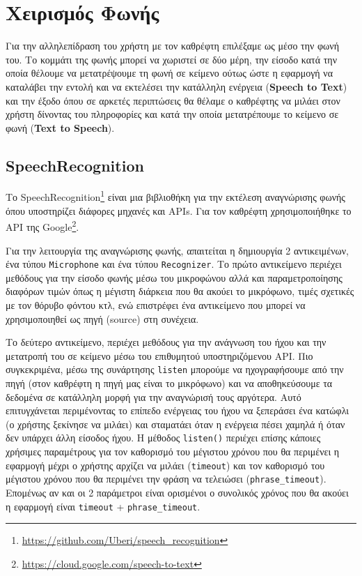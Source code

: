 \section{Χειρισμός Φωνής}
\label{sec:voice}

Για την αλληλεπίδραση του χρήστη με τον καθρέφτη επιλέξαμε ως μέσο την φωνή του. Το κομμάτι της φωνής μπορεί να χωριστεί σε δύο μέρη, την είσοδο κατά την οποία θέλουμε να μετατρέψουμε τη φωνή σε κείμενο ούτως ώστε η εφαρμογή να καταλάβει την εντολή και να εκτελέσει την κατάλληλη ενέργεια (\textbf{Speech to Text}) και την έξοδο όπου σε αρκετές περιπτώσεις θα θέλαμε ο καθρέφτης να μιλάει στον χρήστη δίνοντας του πληροφορίες και κατά την οποία μετατρέπουμε το κείμενο σε φωνή (\textbf{Text to Speech}).

\subsection{SpeechRecognition}
Το SpeechRecognition\footnote{\href{https://github.com/Uberi/speech\_recognition}{https://github.com/Uberi/speech\_recognition}} είναι μια βιβλιοθήκη για την εκτέλεση αναγνώρισης φωνής όπου υποστηρίζει διάφορες μηχανές και APIs. Για τον καθρέφτη χρησιμοποιήθηκε το API της Google\footnote{\href{https://cloud.google.com/speech-to-text}{https://cloud.google.com/speech-to-text}}.

Για την λειτουργία της αναγνώρισης φωνής, απαιτείται η δημιουργία 2 αντικειμένων, ένα τύπου \texttt{Microphone} και ένα τύπου \texttt{Recognizer}. Το πρώτο αντικείμενο περιέχει μεθόδους για την είσοδο φωνής μέσω του μικροφώνου αλλά και παραμετροποίησης διαφόρων τιμών όπως η μέγιστη διάρκεια που θα ακούει το μικρόφωνο, τιμές σχετικές με τον θόρυβο φόντου κτλ, ενώ επιστρέφει ένα αντικείμενο που μπορεί να χρησιμοποιηθεί ως πηγή (source) στη συνέχεια. 

Το δεύτερο αντικείμενο, περιέχει μεθόδους για την ανάγνωση του ήχου και την μετατροπή του σε κείμενο μέσω του επιθυμητού υποστηριζόμενου API. Πιο συγκεκριμένα, μέσω της συνάρτησης \texttt{listen} μπορούμε να ηχογραφήσουμε από την πηγή (στον καθρέφτη η πηγή μας είναι το μικρόφωνο) και να αποθηκεύσουμε τα δεδομένα σε κατάλληλη μορφή για την αναγνώρισή τους αργότερα. Αυτό επιτυγχάνεται περιμένοντας το επίπεδο ενέργειας του ήχου να ξεπεράσει ένα κατώφλι (ο χρήστης ξεκίνησε να μιλάει) και σταματάει όταν η ενέργεια πέσει χαμηλά ή όταν δεν υπάρχει άλλη είσοδος ήχου. Η μέθοδος \texttt{listen()} περιέχει επίσης κάποιες χρήσιμες παραμέτρους για τον καθορισμό του μέγιστου χρόνου που θα περιμένει η εφαρμογή μέχρι ο χρήστης αρχίζει να μιλάει (\texttt{timeout}) και τον καθορισμό του μέγιστου χρόνου που θα περιμένει την φράση να τελειώσει (\texttt{phrase\_timeout}). Επομένως αν και οι 2 παράμετροι είναι ορισμένοι ο συνολικός χρόνος που θα ακούει η εφαρμογή είναι \texttt{timeout} + \texttt{phrase\_timeout}.

